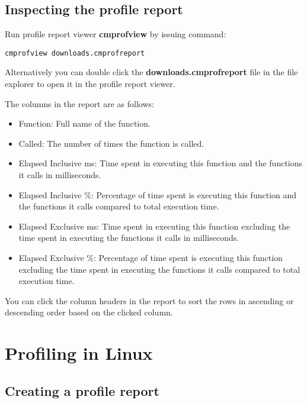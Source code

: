 \documentclass[oneside, a4paper, 11pt]{article}
\begin{document}
\subsection{Inspecting the profile report}

Run profile report viewer \textbf{cmprofview} by issuing command:
\begin{verbatim}
cmprofview downloads.cmprofreport
\end{verbatim}

Alternatively you can double click the \textbf{downloads.cmprofreport} file in the file explorer
to open it in the profile report viewer.

The columns in the report are as follows:

\begin{itemize}

\item Function:
Full name of the function.

\item Called:
The number of times the function is called.

\item Elapsed Inclusive ms:
Time spent in executing this function and the functions it calls in milliseconds.

\item Elapsed Inclusive \%:
Percentage of time spent is executing this function and the functions it calls
compared to total execution time.

\item Elapsed Exclusive ms:
Time spent in executing this function excluding the time spent in executing
the functions it calls in milliseconds.

\item Elapsed Exclusive \%:
Percentage of time spent is executing this function excluding the time spent in executing
the functions it calls compared to total execution time.

\end{itemize}

You can click the column headers in the report to sort the rows in ascending or descending
order based on the clicked column.

\clearpage

\section{Profiling in Linux}

\subsection{Creating a profile report}
\end{document}
